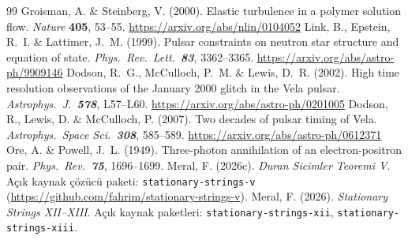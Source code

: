 \documentclass[12pt,a4paper]{article}
\begin{document}
\begin{thebibliography}{99}
     Groisman, A. \& Steinberg, V. (2000). Elastic turbulence in
    a polymer solution flow. \textit{Nature} \textbf{405}, 53--55.
    \url{https://arxiv.org/abs/nlin/0104052}
     Link, B., Epstein, R.~I. \& Lattimer, J.~M. (1999).
    Pulsar constraints on neutron star structure and equation of state.
    \textit{Phys.\ Rev.\ Lett.\ \textbf{83}}, 3362--3365.
    \url{https://arxiv.org/abs/astro-ph/9909146}
     Dodson, R.~G., McCulloch, P.~M. \& Lewis, D.~R. (2002).
    High time resolution observations of the January 2000 glitch in the Vela
    pulsar. \textit{Astrophys.\ J.\ \textbf{578}}, L57--L60.
    \url{https://arxiv.org/abs/astro-ph/0201005}
     Dodson, R., Lewis, D. \& McCulloch, P. (2007). Two decades
    of pulsar timing of Vela. \textit{Astrophys.\ Space Sci.\ \textbf{308}}, 585--589.
    \url{https://arxiv.org/abs/astro-ph/0612371}
     Ore, A. \& Powell, J.~L. (1949). Three-photon annihilation
    of an electron-positron pair. \textit{Phys.\ Rev.\ \textbf{75}}, 1696--1699.
     Meral, F. (2026c). \textit{Duran Sicimler Teoremi V}.
    Açık kaynak çözücü paketi: \texttt{stationary-strings-v}
    (\url{https://github.com/fahrim/stationary-strings-v}).
     Meral, F. (2026). \textit{Stationary Strings XII--XIII}.
    Açık kaynak paketleri: \texttt{stationary-strings-xii}, \texttt{stationary-strings-xiii}.
\end{thebibliography}
\end{document}
